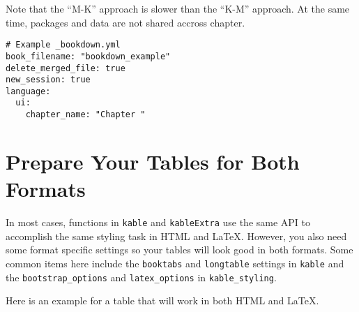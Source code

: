 \documentclass[]{book}
\newenvironment{Shaded}{\begin{snugshade}}{\end{snugshade}}
\newcommand{\DataTypeTok}[1]{\textcolor[rgb]{0.13,0.29,0.53}{#1}}
\newcommand{\DecValTok}[1]{\textcolor[rgb]{0.00,0.00,0.81}{#1}}
\newcommand{\KeywordTok}[1]{\textcolor[rgb]{0.13,0.29,0.53}{\textbf{#1}}}
\newcommand{\NormalTok}[1]{#1}
\newcommand{\OperatorTok}[1]{\textcolor[rgb]{0.81,0.36,0.00}{\textbf{#1}}}
\newcommand{\StringTok}[1]{\textcolor[rgb]{0.31,0.60,0.02}{#1}}
\begin{document}
Note that the ``M-K'' approach is slower than the ``K-M'' approach. At
the same time, packages and data are not shared accross chapter.

\begin{verbatim}
# Example _bookdown.yml
book_filename: "bookdown_example"
delete_merged_file: true
new_session: true
language:
  ui:
    chapter_name: "Chapter "
\end{verbatim}

\hypertarget{prepare-your-tables-for-both-formats}{%
\section{Prepare Your Tables for Both
Formats}\label{prepare-your-tables-for-both-formats}}

In most cases, functions in \texttt{kable} and \texttt{kableExtra} use
the same API to accomplish the same styling task in HTML and LaTeX.
However, you also need some format specific settings so your tables will
look good in both formats. Some common items here include the
\texttt{booktabs} and \texttt{longtable} settings in \texttt{kable} and
the \texttt{bootstrap\_options} and \texttt{latex\_options} in
\texttt{kable\_styling}.

Here is an example for a table that will work in both HTML and LaTeX.

\begin{Shaded}
\end{Shaded}
\end{document}
